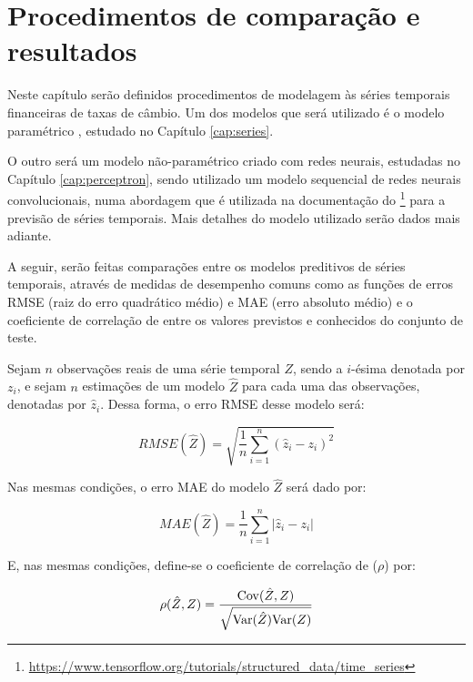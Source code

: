 
\chapter{Procedimentos de comparação e resultados}
\label{cap:comparacao}

Neste capítulo serão definidos procedimentos de modelagem às séries temporais financeiras de taxas de câmbio. Um dos modelos que será utilizado é o modelo paramétrico , estudado no Capítulo \ref{cap:series}. 

O outro será um modelo não-paramétrico criado com redes neurais, estudadas no Capítulo \ref{cap:perceptron}, sendo utilizado um modelo sequencial de redes neurais convolucionais, numa abordagem que é utilizada na documentação do \footnote{\url{https://www.tensorflow.org/tutorials/structured_data/time_series}} para a previsão de séries temporais. Mais detalhes do modelo utilizado serão dados mais adiante.

A seguir, serão feitas comparações entre os modelos preditivos de séries temporais, através de medidas de desempenho comuns como as funções de erros RMSE (raiz do erro quadrático médio) e MAE (erro absoluto médio) e o coeficiente de correlação de  entre os valores previstos e conhecidos do conjunto de teste.

Sejam $n$ observações reais de uma série temporal $Z$, sendo a $i$-ésima denotada por $z_i$, e sejam $n$ estimações de um modelo $\hat{Z}$ para cada uma das observações, denotadas por $\hat{z}_i$. Dessa forma, o erro RMSE desse modelo será:

\begin{equation}\label{eq:rmse}
RMSE(\hat{Z}) = \sqrt{\frac{1}{n} \sum_{i=1}^{n} (\hat{z}_i - z_i)^2}
\end{equation}

Nas mesmas condições, o erro MAE do modelo $\hat{Z}$ será dado por:

\begin{equation}\label{eq:mae}
MAE(\hat{Z}) = \frac{1}{n} \sum_{i=1}^{n} |\hat{z}_i - z_i|
\end{equation}

E, nas mesmas condições, define-se o coeficiente de correlação de  ($\rho$) por:

\begin{equation}\label{eq:rho}
\rho(\hat{Z}, Z) = \frac{\mathrm{Cov} (\hat{Z}, Z)}{\sqrt{\mathrm{Var}({\hat{Z}})\mathrm{Var}({Z})}}
\end{equation}


